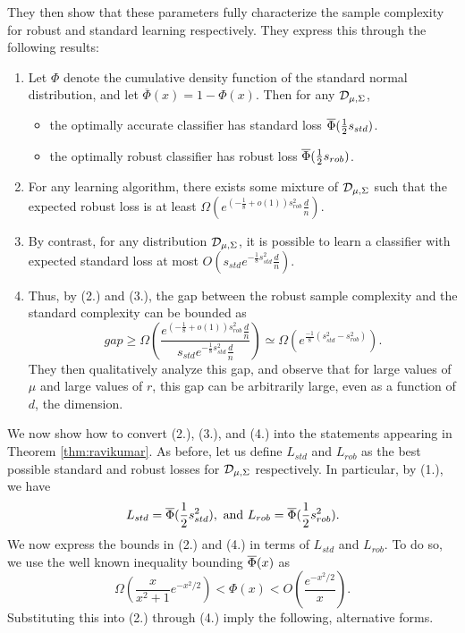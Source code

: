 They then show that these parameters fully characterize the sample complexity for robust and standard learning respectively. They express this through the following results:
\begin{enumerate}
	\item Let $\Phi$ denote the cumulative density function of the standard normal distribution, and let $\overline{\Phi}(x) = 1 - \Phi(x)$. Then for any ${\mathcal D}_{\mu, \Sigma}$, 
		\begin{itemize}
			\item the optimally accurate classifier has standard loss $\overline{\Phi}(\frac{1}{2}s_{std})$.
			\item the optimally robust classifier has robust loss $\overline{\Phi}(\frac{1}{2}s_{rob})$.
		\end{itemize}		 
	\item For any learning algorithm, there exists some mixture of ${\mathcal D}_{\mu, \Sigma}$ such that the expected robust loss is at least $\Omega(e^{(-\frac{1}{8} + o(1))s_{rob}^2}\frac{d}{n})$.
	\item By contrast, for any distribution ${\mathcal D}_{\mu , \Sigma}$, it is possible to learn a classifier with expected standard loss at most $O(s_{std}e^{-\frac{1}{8}s_{std}^2}\frac{d}{n})$.
	\item Thus, by (2.) and (3.), the gap between the robust sample complexity and the standard complexity can be bounded as $$gap \geq \Omega\left(\frac{e^{(-\frac{1}{8} + o(1))s_{rob}^2}\frac{d}{n}}{s_{std}e^{-\frac{1}{8}s_{std}^2}\frac{d}{n}}\right) \simeq \Omega(e^{\frac{-1}{8}(s_{std}^2 - s_{rob}^2)}).$$ They then qualitatively analyze this gap, and observe that for large values of $\mu$ and large values of $r$, this gap can be arbitrarily large, even as a function of $d$, the dimension.
\end{enumerate}

We now show how to convert (2.), (3.), and (4.) into the statements appearing in Theorem \ref{thm:ravikumar}. As before, let us define $L_{std}$ and $L_{rob}$ as the best possible standard and robust losses for ${\mathcal D}_{\mu , \Sigma}$ respectively. In particular, by (1.), we have $$L_{std} = \overline{\Phi}(\frac{1}{2}s_{std}^2),\text{ and }L_{rob} = \overline{\Phi}(\frac{1}{2}s_{rob}^2).$$ We now express the bounds in (2.) and (4.) in terms of $L_{std}$ and $L_{rob}$. To do so, we use the well known inequality bounding $\overline{\Phi}(x)$ as $$\Omega(\frac{x}{x^2 + 1}e^{-x^2/2}) < \Phi(x) <  O(\frac{e^{-x^2/2}}{x}).$$ Substituting this into (2.) through (4.) imply the following, alternative forms.

